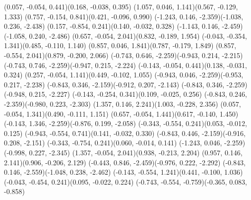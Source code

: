 \pstThreeDLine[linecolor=gray](0.057, -0.054, 0.441)(0.168, -0.038, 0.395)
\pstThreeDLine[linecolor=gray](1.057, 0.046, 1.141)(0.567, -0.129, 1.333)
\pstThreeDLine[linecolor=gray](0.757, -0.154, 0.841)(0.421, -0.096, 0.990)
\pstThreeDLine[linecolor=gray](-1.243, 0.146, -2.359)(-1.038, 0.236, -2.438)
\pstThreeDLine[linecolor=gray](0.157, -0.854, 0.241)(0.140, -0.032, 0.328)
\pstThreeDLine[linecolor=gray](-1.143, 0.146, -2.459)(-1.058, 0.240, -2.486)
\pstThreeDLine[linecolor=gray](0.657, -0.054, 2.041)(0.832, -0.189, 1.954)
\pstThreeDLine[linecolor=gray](-0.043, -0.354, 1.341)(0.485, -0.110, 1.140)
\pstThreeDLine[linecolor=gray](0.857, 0.046, 1.841)(0.787, -0.179, 1.849)
\pstThreeDLine[linecolor=gray](0.857, -0.554, 2.041)(0.879, -0.200, 2.066)
\pstThreeDLine[linecolor=gray](-0.743, 0.646, -2.259)(-0.943, 0.214, -2.215)
\pstThreeDLine[linecolor=gray](-0.743, 0.746, -2.259)(-0.947, 0.215, -2.224)
\pstThreeDLine[linecolor=gray](-0.143, -0.054, 0.441)(0.138, -0.031, 0.324)
\pstThreeDLine[linecolor=gray](0.257, -0.054, 1.141)(0.449, -0.102, 1.055)
\pstThreeDLine[linecolor=gray](-0.943, 0.046, -2.259)(-0.953, 0.217, -2.238)
\pstThreeDLine[linecolor=gray](-0.843, 0.346, -2.159)(-0.912, 0.207, -2.143)
\pstThreeDLine[linecolor=gray](-0.843, 0.346, -2.259)(-0.948, 0.215, -2.227)
\pstThreeDLine[linecolor=gray](-0.143, -0.254, 0.341)(0.109, -0.025, 0.256)
\pstThreeDLine[linecolor=gray](-0.843, 0.246, -2.359)(-0.980, 0.223, -2.303)
\pstThreeDLine[linecolor=gray](1.357, 0.146, 2.241)(1.003, -0.228, 2.356)
\pstThreeDLine[linecolor=gray](0.057, -0.054, 1.341)(0.490, -0.111, 1.151)
\pstThreeDLine[linecolor=gray](0.657, -0.054, 1.441)(0.617, -0.140, 1.450)
\pstThreeDLine[linecolor=gray](-0.143, 1.346, -2.259)(-0.876, 0.199, -2.058)
\pstThreeDLine[linecolor=gray](-0.343, -0.554, 0.241)(0.053, -0.012, 0.125)
\pstThreeDLine[linecolor=gray](-0.943, -0.554, 0.741)(0.141, -0.032, 0.330)
\pstThreeDLine[linecolor=gray](-0.843, 0.446, -2.159)(-0.916, 0.208, -2.151)
\pstThreeDLine[linecolor=gray](-0.343, -0.754, 0.241)(0.060, -0.014, 0.141)
\pstThreeDLine[linecolor=gray](-1.243, 0.046, -2.259)(-0.998, 0.227, -2.345)
\pstThreeDLine[linecolor=gray](1.357, -0.054, 2.041)(0.938, -0.213, 2.204)
\pstThreeDLine[linecolor=gray](0.957, 0.146, 2.141)(0.906, -0.206, 2.129)
\pstThreeDLine[linecolor=gray](-0.443, 0.846, -2.459)(-0.976, 0.222, -2.292)
\pstThreeDLine[linecolor=gray](-0.843, 0.146, -2.559)(-1.048, 0.238, -2.462)
\pstThreeDLine[linecolor=gray](-0.143, -0.554, 1.241)(0.441, -0.100, 1.036)
\pstThreeDLine[linecolor=gray](-0.043, -0.454, 0.241)(0.095, -0.022, 0.224)
\pstThreeDLine[linecolor=gray](-0.743, -0.554, -0.759)(-0.365, 0.083, -0.858)
